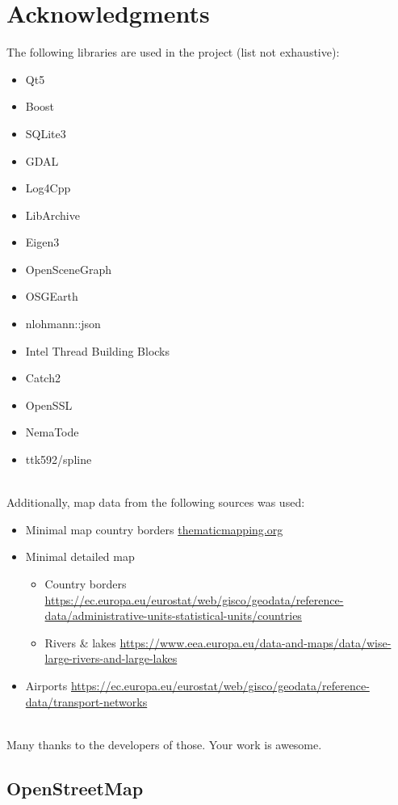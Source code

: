  \section{Acknowledgments}

The following libraries are used in the project (list not exhaustive):

\begin{itemize}  
\item Qt5
\item Boost
\item SQLite3
\item GDAL
\item Log4Cpp
\item LibArchive
\item Eigen3
\item OpenSceneGraph
\item OSGEarth
\item nlohmann::json
\item Intel Thread Building Blocks
\item Catch2
\item OpenSSL
\item NemaTode
\item ttk592/spline
\end{itemize}
\ \\

Additionally, map data from the following sources was used:
\begin{itemize}  
\item Minimal map country borders \url{thematicmapping.org}
\item Minimal detailed map
\begin{itemize} 
\item Country borders \url{https://ec.europa.eu/eurostat/web/gisco/geodata/reference-data/administrative-units-statistical-units/countries}
\item Rivers \& lakes \url{https://www.eea.europa.eu/data-and-maps/data/wise-large-rivers-and-large-lakes}
\end{itemize}
\item Airports \url{https://ec.europa.eu/eurostat/web/gisco/geodata/reference-data/transport-networks}
\end{itemize}
\ \\

Many thanks to the developers of those. Your work is awesome.

\subsection{OpenStreetMap}

